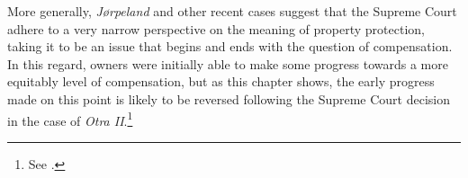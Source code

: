 More generally, {\it Jørpeland} and other recent cases suggest that the Supreme Court adhere to a very narrow perspective on the meaning of property protection, taking it to be an issue that begins and ends with the question of compensation. In this regard, owners were initially able to make some progress towards a more equitably level of compensation, but as this chapter shows, the early progress made on this point is likely to be reversed following the Supreme Court decision in the case of {\it Otra II}.\footnote{See \cite{otra13}.}



%
%

